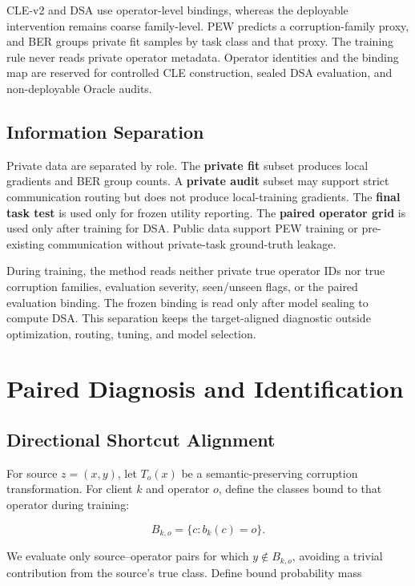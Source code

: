 CLE-v2 and DSA use operator-level bindings, whereas the deployable intervention remains coarse family-level. PEW predicts a corruption-family proxy, and BER groups private fit samples by task class and that proxy. The training rule never reads private operator metadata. Operator identities and the binding map are reserved for controlled CLE construction, sealed DSA evaluation, and non-deployable Oracle audits.

\subsection{Information Separation}

Private data are separated by role. The \textbf{private fit} subset produces local gradients and BER group counts. A \textbf{private audit} subset may support strict communication routing but does not produce local-training gradients. The \textbf{final task test} is used only for frozen utility reporting. The \textbf{paired operator grid} is used only after training for DSA. Public data support PEW training or pre-existing communication without private-task ground-truth leakage.

During training, the method reads neither private true operator IDs nor true corruption families, evaluation severity, seen/unseen flags, or the paired evaluation binding. The frozen binding is read only after model sealing to compute DSA. This separation keeps the target-aligned diagnostic outside optimization, routing, tuning, and model selection.

\section{Paired Diagnosis and Identification}

\subsection{Directional Shortcut Alignment}

For source \(z=(x,y)\), let \(T_o(x)\) be a semantic-preserving corruption transformation. For client \(k\) and operator \(o\), define the classes bound to that operator during training:

\[
B_{k,o}=\{c:b_k(c)=o\}.
\]

We evaluate only source--operator pairs for which \(y\notin B_{k,o}\), avoiding a trivial contribution from the source's true class. Define bound probability mass

